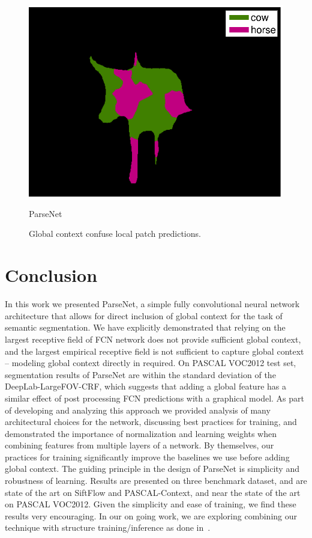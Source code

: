 \documentclass{article} %
\begin{document}
\begin{figure}
\begin{subtable}[b]{0.24\linewidth}
		\includegraphics[width=\linewidth]{figure/2008_006528_context-eps-converted-to.pdf}
		\caption{ParseNet}
	\end{subtable}
	\caption{Global context confuse local patch predictions.}
	\label{fig:globalcontextconfuse}
\end{figure}
\section{Conclusion}
\label{sec:futurework}
In this work we presented ParseNet, a simple fully convolutional neural network architecture that allows for direct inclusion of global context for the task of semantic segmentation. We have explicitly demonstrated that relying on the largest receptive field of FCN network does not provide sufficient global context, and the largest empirical receptive field is not sufficient to capture global context -- modeling global context directly in required. On PASCAL VOC2012 test set, segmentation results of ParseNet are within the standard deviation of the DeepLab-LargeFOV-CRF, which suggests that adding a global feature has a similar effect of post processing FCN predictions with a graphical model. As part of developing and analyzing this approach we provided analysis of many architectural choices for the network, discussing best practices for training, and demonstrated the importance of normalization and learning weights when combining features from multiple layers of a network. By themselves, our practices for training significantly improve the baselines we use before adding global context. The guiding principle in the design of ParseNet is simplicity and robustness of learning. Results are presented on three benchmark dataset, and are state of the art on SiftFlow and PASCAL-Context, and near the state of the art on PASCAL VOC2012. Given the simplicity and ease of training, we find these results very encouraging. In our on going work, we are exploring combining our technique with structure training/inference as done in~\cite{schwing2015fully, lin2015efficient, zheng2015conditional}.


\end{document}
